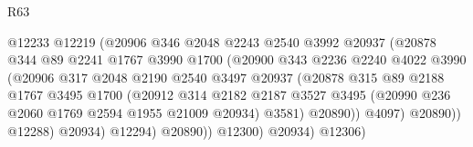 \begin{lexlean}{R63}
\begin{coremodule}
                                    @12233
                                    @12219
                                    (@20906
                                      @346
                                      @2048
                                      @2243
                                      @2540
                                      @3992
                                      @20937
                                      (@20878
                                        @344
                                        @89
                                        @2241
                                        @1767
                                        @3990
                                        @1700
                                        (@20900
                                          @343
                                          @2236
                                          @2240
                                          @4022
                                          @3990
                                          (@20906
                                            @317
                                            @2048
                                            @2190
                                            @2540
                                            @3497
                                            @20937
                                            (@20878
                                              @315
                                              @89
                                              @2188
                                              @1767
                                              @3495
                                              @1700
                                              (@20912
                                                @314
                                                @2182
                                                @2187
                                                @3527
                                                @3495
                                                (@20990 @236 @2060 @1769 @2594 @1955 @21009 @20934)
                                                @3581)
                                              @20890))
                                          @4097)
                                        @20890))
                                    @12288)
                                  @20934)
                                @12294)
                              @20890))
                          @12300)
                        @20934)
                      @12306)

\end{coremodule}
\end{lexlean}
